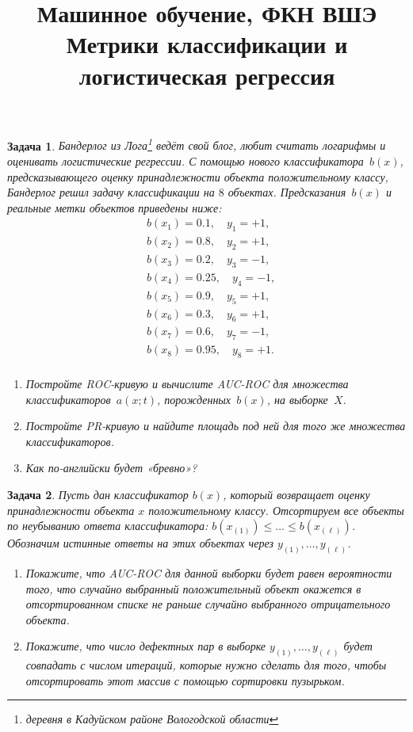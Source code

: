 \documentclass[12pt,fleqn]{article}
\title{Машинное обучение, ФКН ВШЭ\\ Метрики классификации и логистическая регрессия}
\author{}
\date{}
\newtheorem{esProblem}{Задача}
\begin{document}
\maketitle


\begin{esProblem}
    Бандерлог из Лога\footnote{деревня в Кадуйском районе Вологодской области} ведёт свой блог, любит считать логарифмы и оценивать логистические регрессии. С помощью нового классификатора~$b(x)$, предсказывающего оценку принадлежности объекта положительному классу, Бандерлог решил задачу классификации на $8$ объектах. Предсказания~$b(x)$ и реальные метки объектов приведены ниже:
	\begin{align*}
		&b(x_1) = 0.1, \quad  y_1 = +1,\\
		&b(x_2) = 0.8, \quad y_2 = +1,\\
		&b(x_3) = 0.2, \quad y_3 = -1,\\
		&b(x_4) = 0.25, \quad y_4 = -1,\\
		&b(x_5) = 0.9, \quad y_5 = +1,\\
		&b(x_6) = 0.3, \quad y_6 = +1,\\
		&b(x_7) = 0.6, \quad y_7 = -1,\\
		&b(x_8) = 0.95, \quad y_8 = +1.\\
	\end{align*}
	
    \begin{enumerate} 
        \item Постройте ROC-кривую и вычислите AUC-ROC для множества классификаторов~$a(x;t)$, порожденных~$b(x)$, на выборке~$X$.
        \item Постройте PR-кривую и найдите площадь под ней для того же множества классификаторов. 
        \item Как по-английски будет «бревно»?
    \end{enumerate} 
\end{esProblem}

\begin{esProblem}
	Пусть дан  классификатор $b(x)$, который возвращает оценку принадлежности объекта $x$ положительному классу. Отсортируем все объекты по неубыванию ответа классификатора: $b(x_{(1)}) \le \dots \le b(x_{(\ell)})$. Обозначим истинные ответы на этих объектах через $y_{(1)}, \dots, y_{(\ell)}$.
	
	\begin{enumerate} 
	\item Покажите, что AUC-ROC для данной выборки будет равен вероятности того, что случайно выбранный положительный объект окажется в отсортированном списке не раньше случайно выбранного отрицательного объекта.
	
	\item Покажите, что число дефектных пар в выборке $y_{(1)}, \dots, y_{(\ell)}$ будет совпадать с числом итераций, которые нужно сделать для того, чтобы отсортировать этот массив с помощью сортировки пузырьком. 
	\end{enumerate} 
\end{esProblem}
\end{document}
